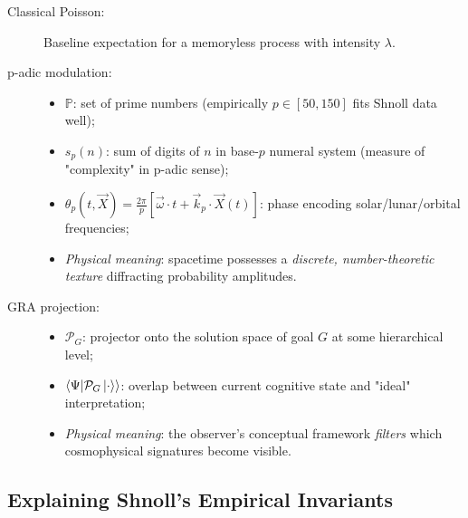 \documentclass[12pt,a4paper]{article}
\theoremstyle{plain}
\theoremstyle{definition}
\theoremstyle{remark}
\newcommand{\bbP}{\mathbb{P}}
\newcommand{\cP}{\mathcal{P}}
\newcommand{\vX}{\vec{X}}
\newcommand{\vomega}{\vec{\omega}}
\newcommand{\vk}{\vec{k}}
\newcommand{\inner}[2]{\left\langle #1 \middle| #2 \right\rangle}
\begin{document}
\begin{description}
    \item[Classical Poisson:] Baseline expectation for a memoryless process with intensity $\lambda$.
    
    \item[p-adic modulation:]
    \begin{itemize}
        \item $\bbP$: set of prime numbers (empirically $p \in [50, 150]$ fits Shnoll data well);
        \item $s_p(n)$: sum of digits of $n$ in base-$p$ numeral system (measure of "complexity" in p-adic sense);
        \item $\theta_p(t, \vX) = \frac{2\pi}{p} \left[ \vomega \cdot t + \vk_p \cdot \vX(t) \right]$: phase encoding solar/lunar/orbital frequencies;
        \item \emph{Physical meaning}: spacetime possesses a \emph{discrete, number-theoretic texture} diffracting probability amplitudes.
    \end{itemize}
    
    \item[GRA projection:]
    \begin{itemize}
        \item $\cP_{G}$: projector onto the solution space of goal $G$ at some hierarchical level;
        \item $\inner{\Psi}{\cP_{G} \ket{\cdot}}$: overlap between current cognitive state and "ideal" interpretation;
        \item \emph{Physical meaning}: the observer's conceptual framework \emph{filters} which cosmophysical signatures become visible.
    \end{itemize}
\end{description}

\subsection{Explaining Shnoll's Empirical Invariants}
\end{document}
